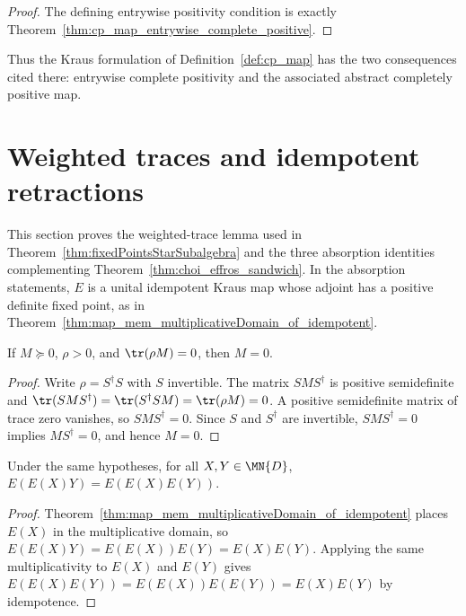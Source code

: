 \begin{proof}\leanok
    The defining entrywise positivity condition is exactly
    Theorem~\ref{thm:cp_map_entrywise_complete_positive}.
\end{proof}

Thus the Kraus formulation of Definition~\ref{def:cp_map} has the two
consequences cited there: entrywise complete positivity and the associated
abstract completely positive map.

\section{Weighted traces and idempotent retractions}

This section proves the weighted-trace lemma used in
Theorem~\ref{thm:fixedPointsStarSubalgebra} and the three absorption identities
complementing Theorem~\ref{thm:choi_effros_sandwich}. In the absorption
statements, $E$ is a unital idempotent Kraus map whose adjoint has a positive
definite fixed point, as in
Theorem~\ref{thm:map_mem_multiplicativeDomain_of_idempotent}.

\begin{lemma}
    \label{lem:posDef_weighted_trace_faithful}
    \leanok
    If $M\succeq0$, $\rho>0$, and $\tr(\rho M)=0$, then $M=0$.
\end{lemma}

\begin{proof}\leanok
    Write $\rho=S^\dagger S$ with $S$ invertible. The matrix
    $SMS^\dagger$ is positive semidefinite and
    $\tr(SMS^\dagger)=\tr(S^\dagger SM)=\tr(\rho M)=0$.
    A positive semidefinite matrix of trace zero vanishes, so
    $SMS^\dagger=0$. Since $S$ and $S^\dagger$ are invertible,
    $SMS^\dagger=0$ implies $MS^\dagger=0$, and hence $M=0$.
\end{proof}

\begin{theorem}
    \label{thm:choi_effros_left}
    \leanok
    Under the same hypotheses, for all $X,Y\in\MN{D}$,
    $E(E(X)Y)=E(E(X)E(Y))$.
\end{theorem}

\begin{proof}\leanok
    Theorem~\ref{thm:map_mem_multiplicativeDomain_of_idempotent} places
    $E(X)$ in the multiplicative domain, so
    $E(E(X)Y)=E(E(X))E(Y)=E(X)E(Y)$.
    Applying the same multiplicativity to $E(X)$ and $E(Y)$ gives
    $E(E(X)E(Y))=E(E(X))E(E(Y))=E(X)E(Y)$ by idempotence.
\end{proof}

